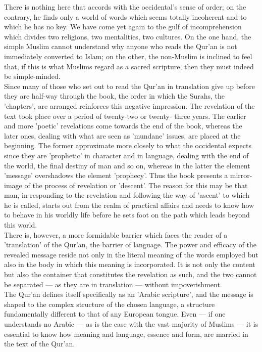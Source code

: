 \documentclass[10pt, twoside,openright]{book}
\begin{document}
There is nothing here that accords with the occidental's sense of order; on the contrary, he finds 
only a world of words which seems totally incoherent and to which he has no key. We have come yet 
again to the gulf of incomprehension which divides two religions, two mentalities, two cultures. On 
the one hand, the simple Muslim cannot understand why anyone who reads the Qur'an is not immediately 
converted to Islam; on the other, the non\hyp{}Muslim is inclined to feel that, if this is what Muslims 
regard as a sacred scripture, then they must indeed be simple\hyp{}minded. \\

Since many of those who set out to read the Qur'an in translation give up before they are half\hyp{}way 
through the book, the order in which the Surahs, the 'chapters', are arranged reinforces this 
negative impression. The revelation of the text took place over a period of twenty\hyp{}two or twenty\hyp{}
three years. The earlier and more 'poetic' revelations come towards the end of the book, whereas the 
later ones, dealing with what are seen as 'mundane' issues, are placed at the beginning. The former 
approximate more closely to what the occidental expects since they are 'prophetic' in character and 
in language, dealing with the end of the world, the final destiny of man and so on, whereas in the 
latter the element 'message' overshadows the element 'prophecy'. Thus the book presents a mirror\hyp{}
image of the process of revelation or 'descent'. The reason for this may be that man, in responding 
to the revelation and following the way of 'ascent' to which he is called, starts out from the realm 
of practical affairs and needs to know how to behave in his worldly life before he sets foot on the 
path which leads beyond this world. \\

There is, however, a more formidable barrier which faces the reader of a 'translation' of the Qur'an, 
the barrier of language. The power and efficacy of the revealed message reside not only in the 
literal meaning of the words employed but also in the body in which this meaning is incorporated. It 
is not only the content but also the container that constitutes the revelation as such, and the two 
cannot be separated --- as they are in translation --- without impoverishment. \\

The Qur'an defines itself specifically as an 'Arabic scripture', and the message is shaped to the 
complex structure of the chosen language, a structure fundamentally different to that of any European 
tongue. Even --- if one understands no Arabic --- as is the case with the vast majority of Muslims --- it 
is essential to know how meaning and language, essence and form, are married in the text of the 
Qur'an. \\
\end{document}
